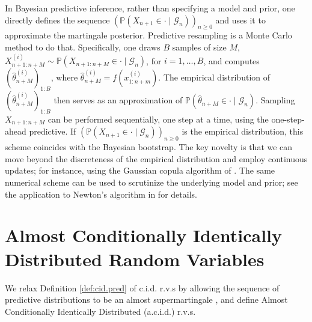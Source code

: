 \documentclass{article}
\theoremstyle{definition}
\renewcommand{\&}{and}
\begin{document}
In Bayesian predictive inference, rather than specifying a model and prior, one directly defines the sequence $(\mathbb{P}(X_{n+1} \in \cdot \mid \mathcal{G}_{n}))_{n \geq 0}$ and uses it to approximate the martingale posterior. %
Predictive resampling is a Monte Carlo method to do that. Specifically, one draws $B$ samples of size $M$, $X^{(i)}_{n+1:n+M} \sim \mathbb{P}(X_{n+1:n+M} \in \cdot \mid \mathcal{G}_n)$, for $i=1,\ldots,B$, and computes $(\hat{\theta}^{(i)}_{n+M})_{1:B}$, where $\hat{\theta}^{(i)}_{n+M}=f(x_{1:n+m}^{(i)})$. The empirical distribution of $(\hat{\theta}^{(i)}_{n+M})_{1:B}$ then serves as an approximation of $\mathbb{P}(\hat{\theta}_{n+M} \in \cdot \mid \mathcal{G}_n)$. Sampling $X_{n+1:n+M}$ can be performed sequentially, one step at a time, using the one-step-ahead predictive. If $(\mathbb{P}(X_{n+1} \in \cdot \mid \mathcal{G}_{n}))_{n \geq 0}$ is the empirical distribution, this scheme coincides with the Bayesian bootstrap. The key novelty is that we can move beyond the discreteness of the empirical distribution and employ continuous updates; for instance, using the Gaussian copula algorithm of \cite{hahn18}. The same numerical scheme can be used to scrutinize the underlying model and prior; see the application to Newton’s algorithm in \cite{fortini2020quasi} for details.

\section{Almost Conditionally Identically Distributed Random Variables } \label{sec:acid}

We relax Definition \ref{def:cid.pred} of c.i.d. r.v.s by allowing the sequence of predictive distributions 
to be an almost supermartingale \citep{robbins1971convergence}, and define Almost Conditionally Identically Distributed (a.c.i.d.) r.v.s. %
\end{document}
